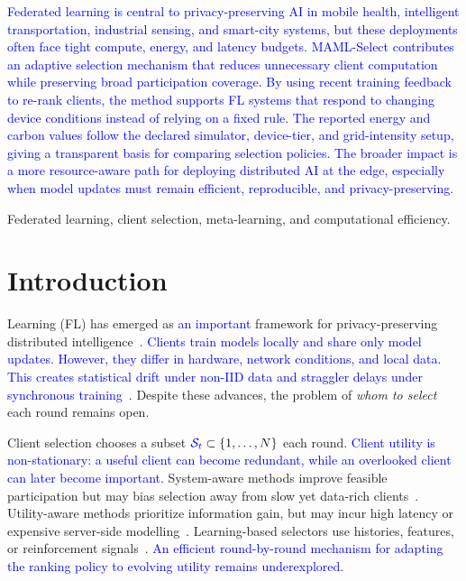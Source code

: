 \documentclass[journal]{IEEEtran}
\newcommand{\revision}[1]{\textcolor{blue}{#1}}
\begin{document}
\renewcommand\IEEEkeywordsname{Impact Statement}
\begin{IEEEkeywords}
\revision{Federated learning is central to privacy-preserving AI in mobile health, intelligent transportation, industrial sensing, and smart-city systems, but these deployments often face tight compute, energy, and latency budgets. MAML-Select contributes an adaptive selection mechanism that reduces unnecessary client computation while preserving broad participation coverage. By using recent training feedback to re-rank clients, the method supports FL systems that respond to changing device conditions instead of relying on a fixed rule. The reported energy and carbon values follow the declared simulator, device-tier, and grid-intensity setup, giving a transparent basis for comparing selection policies. The broader impact is a more resource-aware path for deploying distributed AI at the edge, especially when model updates must remain efficient, reproducible, and privacy-preserving.}


\end{IEEEkeywords}
\renewcommand\IEEEkeywordsname{Index Terms}
\begin{IEEEkeywords}
Federated learning, client selection, meta-learning, and computational efficiency.
\end{IEEEkeywords}
\section{Introduction}

 Learning (FL) has emerged as \revision{an important} framework for privacy-preserving distributed intelligence~\cite{mcmahan2017communication}. \revision{Clients train models locally and share only model updates. However, they differ in hardware, network conditions, and local data. This creates statistical drift under non-IID data and straggler delays under synchronous training}~\cite{karimireddy2020scaffold,mai2024study,tapwal2026stragglers,forootani2026asynchronous,borazjani2026redefining}. Despite these advances, the problem of \textit{whom to select} each round remains open.

Client selection chooses a subset $\revision{\mathcal{S}_t} \subset \{1, \ldots, N\}$ each round. \revision{Client utility is non-stationary: a useful client can become redundant, while an overlooked client can later become important.} System-aware methods improve feasible participation but may bias selection away from slow yet data-rich clients~\cite{nishio2019client,chai2020tifl}. Utility-aware methods prioritize information gain, but may incur high latency or expensive server-side modelling~\cite{lai2021oort,tang2022fedcor,xu2024federated,yan2023criticalfl,ning2024fedgcs}. Learning-based selectors use histories, features, or reinforcement signals~\cite{wang2020optimizing,pan2024contextual,kazemi2026robust}. \revision{An efficient round-by-round mechanism for adapting the ranking policy to evolving utility remains underexplored.}
\end{document}
